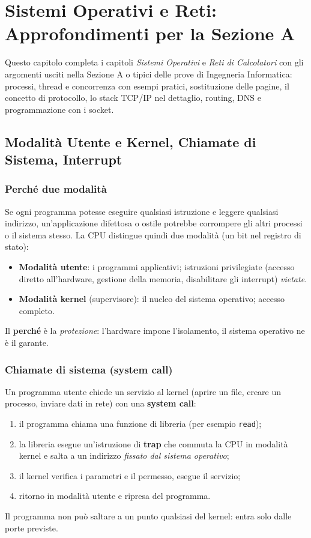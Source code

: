 \chapter[Sistemi Operativi e Reti: Approfondimenti]{Sistemi Operativi e Reti: Approfondimenti per la Sezione A}

Questo capitolo completa i capitoli \emph{Sistemi Operativi} e \emph{Reti di Calcolatori} con gli argomenti usciti nella Sezione A o tipici delle prove di Ingegneria Informatica: processi, thread e concorrenza con esempi pratici, sostituzione delle pagine, il concetto di protocollo, lo stack TCP/IP nel dettaglio, routing, DNS e programmazione con i socket.

\bigskip
{}

\section{Modalità Utente e Kernel, Chiamate di Sistema, Interrupt}

\subsection{Perché due modalità}
Se ogni programma potesse eseguire qualsiasi istruzione e leggere qualsiasi indirizzo, un'applicazione difettosa o ostile potrebbe corrompere gli altri processi o il sistema stesso. La CPU distingue quindi due modalità (un bit nel registro di stato):
\begin{itemize}
    \item \textbf{Modalità utente}: i programmi applicativi; istruzioni privilegiate (accesso diretto all'hardware, gestione della memoria, disabilitare gli interrupt) \emph{vietate}.
    \item \textbf{Modalità kernel} (supervisore): il nucleo del sistema operativo; accesso completo.
\end{itemize}
Il \textbf{perché} è la \emph{protezione}: l'hardware impone l'isolamento, il sistema operativo ne è il garante.

\subsection{Chiamate di sistema (system call)}
Un programma utente chiede un servizio al kernel (aprire un file, creare un processo, inviare dati in rete) con una \textbf{system call}:
\begin{enumerate}
    \item il programma chiama una funzione di libreria (per esempio \texttt{read});
    \item la libreria esegue un'istruzione di \textbf{trap} che commuta la CPU in modalità kernel e salta a un indirizzo \emph{fissato dal sistema operativo};
    \item il kernel verifica i parametri e il permesso, esegue il servizio;
    \item ritorno in modalità utente e ripresa del programma.
\end{enumerate}
Il programma non può saltare a un punto qualsiasi del kernel: entra solo dalle porte previste.


